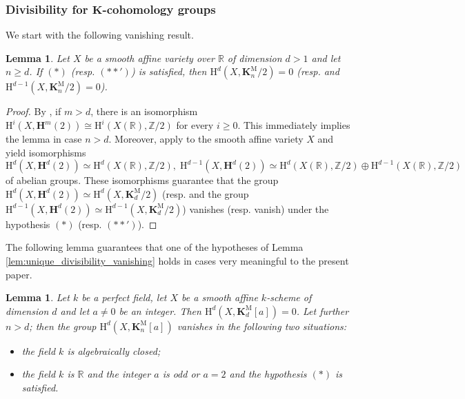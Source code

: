 \documentclass[11pt,leqno]{amsart}
\renewcommand{\1}{{\rm 1\hspace*{-0.4ex}%
\rule{0.1ex}{1.52ex}\hspace*{0.2ex}}}
\newcommand{\Hr}{{\mathrm {H}}}
\newcommand{\<}[1]{{\langle}#1 {\rangle}}
\newcommand{\Rb}{\mathbb{R}}
\newcommand{\Zb}{\mathbb{Z}}
\newcommand{\Kbf}{\mathbf{K}}
\newcommand{\Mr}{\mathrm{M}}
\newcommand{\Hbf}{\mathbf{H}}
\theoremstyle{plain}
\newtheorem{lem}[thm]{Lemma}
\theoremstyle{definition}
\theoremstyle{remark}
\numberwithin{equation}{section}
\begin{document}
\subsubsection*{Divisibility for $\Kbf$-cohomology groups}

We start with the following vanishing result.

\begin{lem}\label{lem:vanishing_no_compact_component}
Let $X$ be a smooth affine variety over $\Rb$ of dimension $d>1$ and let $n\geq d$. If $(*)$ (resp. $(**')$) is satisfied, then $\Hr^d(X,\Kbf_n^\Mr/2)=0$ (resp. and $\Hr^{d-1}(X,\Kbf_n^\Mr/2)=0$).
\end{lem}

\begin{proof}
By \cite[Theorem 2.3.2 (c)]{colliot-theleneZerocyclesCohomologyReal1996}, if $m>d$, there is an isomorphism $\Hr^i(X,\Hbf^{m}(2))\cong\Hr^i(X(\Rb),\Zb/2)$ for every $i\geq 0$. This immediately implies the lemma in case $n>d$. Moreover, \cite[Theorem 3.2 (d), Corollary 3.3 (c)]{colliot-theleneZerocyclesCohomologyReal1996} apply to the smooth affine variety $X$ and yield isomorphisms \[\Hr^d(X,\Hbf^d(2))\simeq\Hr^d(X(\Rb),\Zb/2),\;\Hr^{d-1}(X,\Hbf^d(2))\simeq\Hr^{d}(X(\Rb),\Zb/2)\oplus\Hr^{d-1}(X(\Rb),\Zb/2)\] of abelian groups. These isomorphisms guarantee that the group $\Hr^d(X,\Hbf^d(2))\simeq\Hr^d(X,\Kbf_d^\Mr/2)$ (resp. and the group $\Hr^{d-1}(X,\Hbf^d(2))\simeq\Hr^{d-1}(X,\Kbf_d^\Mr/2)$) vanishes (resp. vanish) under the hypothesis $(*)$ (resp. $(**')$).
\end{proof}

The following lemma guarantees that one of the hypotheses of Lemma \ref{lem:unique_divisibility_vanishing} holds in cases very meaningful to the present paper.

\begin{lem}\label{lem:contraction_of_torsion_milnor_k-theory}
Let $k$ be a perfect field, let $X$ be a smooth affine $k$-scheme of dimension $d$ and let $a\neq 0$ be an integer. Then $\Hr^d(X,\Kbf_d^\Mr[a])=0$. Let further $n>d$; then the group $\Hr^d(X,\Kbf_n^\Mr[a])$ vanishes in the following two situations:
\begin{itemize}
    \item[(i)] the field $k$ is algebraically closed;
    \item[(ii)] the field $k$ is $\Rb$ and the integer $a$ is odd or $a=2$ and the hypothesis $(*)$ is satisfied.
\end{itemize}
\vspace{-\topsep}
\end{lem}
\end{document}
